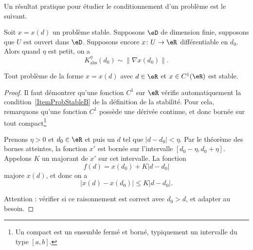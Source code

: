 Un résultat pratique pour étudier le conditionnement d'un problème est le suivant.
\begin{corollary}       \label{CorConditionnementNormeNabla}
	Soit $x=x(d)$ un problème stable. Supposons $\eD$ de dimension finie, supposons que $U$ est ouvert dans $\eD$. Supposons encore $x\colon U\to \eR$ différentiable en $d_0$. Alors quand $\eta$ est petit, on a
	\begin{equation}
		K_{\text{abs}}^{\eta}(d_0)\sim \| \nabla x(d_0) \|.
	\end{equation}
\end{corollary}

\begin{lemma}   \label{LemITCxqyS}
	 Tout  problème de la forme $x=x(d)$ avec $d\in\eR$ et $x \in C^1(\eR)$ est stable.
\end{lemma}

\begin{proof}
	Il faut démontrer qu'une fonction $C^1$ sur $\eR$ vérifie automatiquement la condition~\ref{ItemProbStableB} de la définition de la stabilité. Pour cela, remarquons qu'une fonction $C^1$ possède une dérivée continue, et donc bornée sur tout compact\footnote{Un compact est un ensemble fermé et borné, typiquement un intervalle du type $[a,b]$.}

	Prenons $\eta>0$ et $d_0\in\eR$ et puis un $d$ tel que $| d-d_0 |<\eta$. Par le théorème des bornes atteintes, la fonction $x'$ est bornée sur l'intervalle $[d_0-\eta,d_0+\eta]$. Appelons $K$ un majorant de $x'$ sur cet intervalle. La fonction
	\begin{equation}
		f(d)=x(d_0)+K| d-d_0 |
	\end{equation}
	majore $x(d)$, et donc on a
	\begin{equation}
		\big| x(d)-x(d_0) \big|\leq K| d-d_0 |.
	\end{equation}

	Attention : vérifier si ce raisonnement est correct avec $d_0>d$, et adapter au besoin.
\end{proof}

